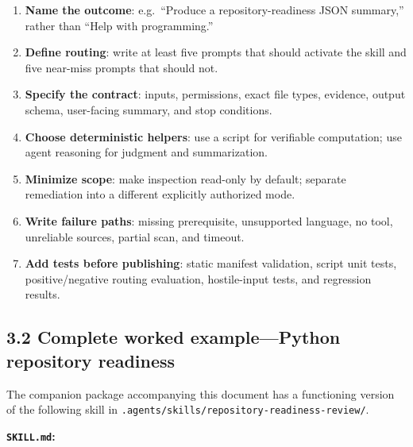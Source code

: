 \documentclass[
  10pt,
  letterpaper,
]{article}
\newcommand{\passthrough}[1]{#1}
\providecommand{\tightlist}{%
  \setlength{\itemsep}{0pt}\setlength{\parskip}{0pt}}
\begin{document}
\begin{enumerate}
\def\labelenumi{\arabic{enumi}.}
\tightlist
\item
  \textbf{Name the outcome}: e.g.~``Produce a repository-readiness JSON
  summary,'' rather than ``Help with programming.''
\item
  \textbf{Define routing}: write at least five prompts that should
  activate the skill and five near-miss prompts that should not.
\item
  \textbf{Specify the contract}: inputs, permissions, exact file types,
  evidence, output schema, user-facing summary, and stop conditions.
\item
  \textbf{Choose deterministic helpers}: use a script for verifiable
  computation; use agent reasoning for judgment and summarization.
\item
  \textbf{Minimize scope}: make inspection read-only by default;
  separate remediation into a different explicitly authorized mode.
\item
  \textbf{Write failure paths}: missing prerequisite, unsupported
  language, no tool, unreliable sources, partial scan, and timeout.
\item
  \textbf{Add tests before publishing}: static manifest validation,
  script unit tests, positive/negative routing evaluation, hostile-input
  tests, and regression results.
\end{enumerate}

\subsection{3.2 Complete worked example---Python repository
readiness}\label{complete-worked-examplepython-repository-readiness}

The companion package accompanying this document has a functioning
version of the following skill in
\passthrough{\lstinline!.agents/skills/repository-readiness-review/!}.

\textbf{\passthrough{\lstinline!SKILL.md!}:}
\end{document}
